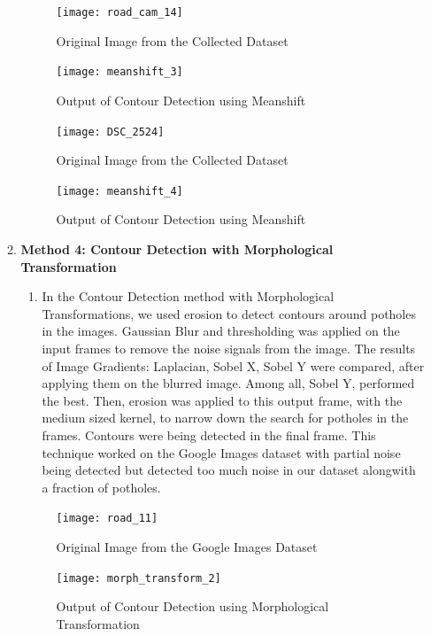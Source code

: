 \documentclass[12pt,a4paper]{article}
\begin{document}
\begin{enumerate}
\begin{enumerate}
    
    \begin{figure}[ht!]
        \centering
        \texttt{[image: road\_cam\_14]}
        \caption{Original Image from the Collected Dataset}
    \end{figure}

    \begin{figure}[ht!]
        \centering
        \texttt{[image: meanshift\_3]}
        \caption{Output of Contour Detection using Meanshift}
    \end{figure}
    \pagebreak
    
    \begin{figure}[ht!]
        \centering
        \texttt{[image: DSC\_2524]}
        \caption{Original Image from the Collected Dataset}
    \end{figure}

    \begin{figure}[ht!]
        \centering
        \texttt{[image: meanshift\_4]}
        \caption{Output of Contour Detection using Meanshift}
    \end{figure}
    \pagebreak
    
    \item \textbf{Method 4: Contour Detection with Morphological Transformation}
    \begin{enumerate}
        \item In the Contour Detection method with Morphological Transformations, we used erosion to detect contours around potholes in the images. Gaussian Blur and thresholding was applied on the input frames to remove the noise signals from the image. The results of Image Gradients: Laplacian, Sobel X, Sobel Y were compared, after applying them on the blurred image. Among all, Sobel Y, performed the best. Then, erosion was applied to this output frame, with the medium sized kernel, to narrow down the search for potholes in the frames. Contours were being detected in the final frame. This technique worked on the Google Images dataset with partial noise being detected but detected too much noise in our dataset alongwith a fraction of potholes.
    \end{enumerate}
    \begin{figure}[ht!]
        \centering
        \texttt{[image: road\_11]}
        \caption{Original Image from the Google Images Dataset}
    \end{figure}

    \begin{figure}[ht!]
        \centering
        \texttt{[image: morph\_transform\_2]}
        \caption{Output of Contour Detection using Morphological Transformation}
    \end{figure}
    \pagebreak
    

\end{enumerate}
\end{enumerate}
\end{document}
